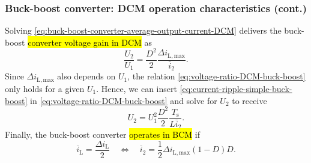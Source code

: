 \begin{frame}
	\frametitle{Buck-boost converter: DCM operation characteristics (cont.)}
	Solving \eqref{eq:buck-boost-converter-average-output-current-DCM} delivers the buck-boost \hl{converter voltage gain in DCM} as
	\begin{equation}
		\frac{U_2}{U_1} = \frac{D^2}{2} \frac{\Delta i_\mathrm{L,max}}{\overline{i}_2}.
		\label{eq:voltage-ratio-DCM-buck-boost}
	\end{equation}
	\pause%
	Since $\Delta i_\mathrm{L,max}$ also depends on $U_1$, the relation \eqref{eq:voltage-ratio-DCM-buck-boost} only holds for a given $U_1$. Hence, we can insert \eqref{eq:current-ripple-simple-buck-boost} in \eqref{eq:voltage-ratio-DCM-buck-boost} and solve for $U_2$ to receive
	\begin{equation}
		U_2= U_1^2 \frac{D^2}{2} \frac{T_\mathrm{s}}{L \overline{i}_2}.
	\end{equation}
	\pause%
	Finally, the buck-boost converter \hl{operates in BCM} if
	\begin{equation}
		\overline{i}_\mathrm{L} = \frac{\Delta i_\mathrm{L}}{2} \quad \Leftrightarrow \quad  \overline{i}_2 = \frac{1}{2} \Delta i_\mathrm{L,max} (1-D)D.
	\end{equation}
\end{frame}

